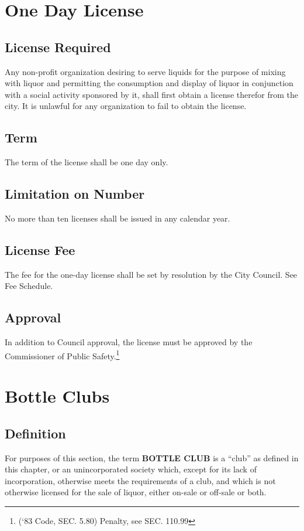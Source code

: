 \setcounter{section}{114}
\section{One Day License}
\subsection{License Required}
Any non-profit organization desiring to serve liquids for the purpose of mixing with liquor and permitting the consumption and display of liquor in conjunction with a social activity sponsored by it, shall first obtain a license therefor from the city. It is unlawful for any organization to fail to obtain the license.
\subsection{Term}
The term of the license shall be one day only.
\subsection{Limitation on Number}
No more than ten licenses shall be issued in any calendar year.
\subsection{License Fee}
The fee for the one-day license shall be set by resolution by the City Council. See Fee Schedule.
\subsection{Approval}
In addition to Council approval, the license must be approved by the Commissioner of Public Safety.\footnote{(‘83 Code, SEC. 5.80)  Penalty, see SEC. 110.99}

\section{Bottle Clubs}
\subsection{Definition}
For purposes of this section, the term \textbf{BOTTLE CLUB} is a “club” as defined in this chapter, or an unincorporated society which, except for its lack of incorporation, otherwise meets the requirements of a club, and which is not otherwise licensed for the sale of liquor, either on-sale or off-sale or both.

